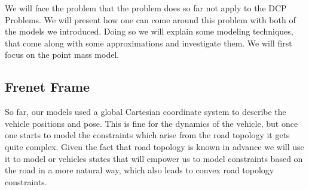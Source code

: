 We will face the problem that the problem does so far not apply to the DCP Problems.
We will present how one can come around this problem with both of the models we introduced.
Doing so we will explain some modeling techniques, that come along with some approximations and investigate them.
We will first focus on the point mass model.

\subsection{Frenet Frame}

So far, our models used a global Cartesian coordinate system to describe the vehicle positions and pose.
This is fine for the dynamics of the vehicle, but once one starts to model the constraints which arise from the road topology it gets quite complex.
Given the fact that road topology is known in advance we will use it to model or vehicles states that will empower us to model constraints based on
the road in a more natural way, which also leads to convex road topology constraints.

